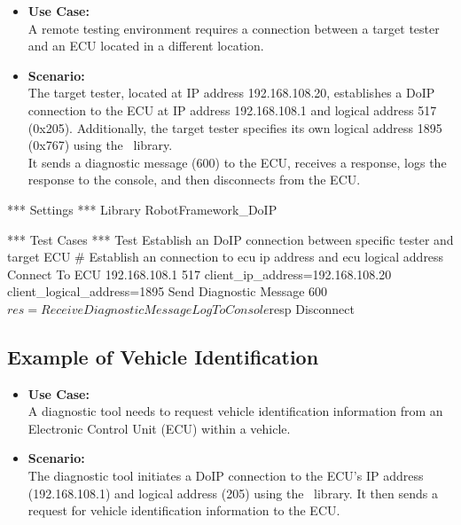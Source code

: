             \begin{itemize}
                \item\textbf{Use Case:}\\
                    A remote testing environment requires a connection between a target tester and an ECU located in a different location.

                \item\textbf{Scenario:} \\
                    The target tester, located at IP address 192.168.108.20, establishes a DoIP connection to the ECU at IP address 192.168.108.1 
                    and logical address 517 (0x205). Additionally, the target tester specifies its own logical address 1895 (0x767) using the \pkg\ 
                    library. \\
                    It sends a diagnostic message (600) to the ECU, receives a response, logs the response to the console, and then disconnects 
                    from the ECU.
            \end{itemize}

            \begin{robotcode}
*** Settings ***
Library    RobotFramework_DoIP

*** Test Cases ***
Test Establish an DoIP connection between specific tester and target ECU 
    # Establish an connection to ecu ip address and ecu logical address
    Connect To ECU     192.168.108.1      517       client_ip_address=192.168.108.20    client_logical_address=1895
    Send Diagnostic Message     600
    ${res}= Receive Diagnostic Message
    Log To Console    ${resp}
    Disconnect
            \end{robotcode}

    \subsection{Example of Vehicle Identification}
        \begin{itemize}
            \item\textbf{Use Case:}\\
                A diagnostic tool needs to request vehicle identification information from an Electronic Control Unit (ECU) within a vehicle.

            \item\textbf{Scenario:} \\
                The diagnostic tool initiates a DoIP connection to the ECU's IP address (192.168.108.1) and logical address (205) using the 
                \pkg\ library. It then sends a request for vehicle identification information to the ECU.
        \end{itemize}

